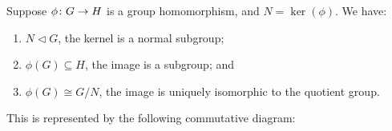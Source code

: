 \begin{theorem}\label{thm:iso-1-group}
    Suppose \(\phi\colon G\to H\) is a group homomorphism,
    and \(N = \ker(\phi)\).
    We have:
    \begin{enumerate}[label={(\alph*)}, itemsep=0mm]
        \item \(N \lhd G\), the kernel is a normal subgroup;
        \item \(\phi(G) \subseteq H\), the image is a subgroup; and
        \item \(\phi(G) \cong G/N\),
            the image is uniquely isomorphic to the quotient group.
    \end{enumerate}

    This is represented by the following commutative diagram:
    \begin{center}
    \end{center}
\end{theorem}
